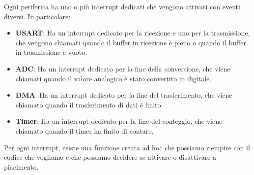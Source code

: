 Ogni periferica ha uno o più interrupt dedicati che vengono attivati con eventi diversi. In particolare:
\begin{itemize}
    \item \textbf{USART}: Ha un interrupt dedicato per la ricezione e uno per la trasmissione, che vengono chiamati quando il buffer in ricezione è pieno o quando il buffer in trasmissione è vuoto.
    \item \textbf{ADC}: Ha un interrupt dedicato per la fine della conversione, che viene chiamati quando il valore analogico è stato convertito in digitale.
    \item \textbf{DMA}: Ha un interrupt dedicato per la fine del trasferimento, che viene chiamato quando il trasferimento di dati è finito.
    \item \textbf{Timer}: Ha un interrupt dedicato per la fine del conteggio, che viene chiamato quando il timer ha finito di contare.
\end{itemize}

Per ogni interrupt, esiste una funzione creata ad hoc che possiamo riempire con il codice che vogliamo e che possiamo decidere se attivare o disattivare a piacimento.

